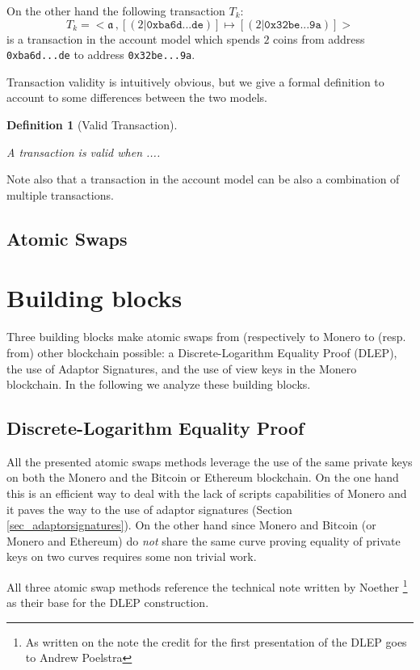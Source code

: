 \documentclass[runningheads]{llncs}
\newcommand{\tx}[3]{<\mathfrak{#1}\,, [#2]\mapsto[#3]>}
\newtheorem{deff}{Definition}
\begin{document}
On the other hand the following transaction $T_k$:
$$
T_k = \tx a {(2|\texttt{0xba6d...de})}{(2|\texttt{0x32be...9a})}
$$
is a transaction in the account model which spends $2$ coins from address \texttt{0xba6d...de} to  address \texttt{0x32be...9a}.

Transaction validity is intuitively obvious, but we give a formal definition to account to some differences between the two models.
\begin{deff}[Valid Transaction]\label{def_transaction_validity}
    
    A transaction is valid when ....
\end{deff}
Note also that a transaction in the account model can be also a combination of multiple transactions. 


\subsection{Atomic Swaps}
\label{sec_atomic_swaps}


\section{Building blocks}
Three building blocks make atomic swaps from (respectively to Monero to (resp. from) other blockchain possible: a Discrete-Logarithm Equality Proof (DLEP), the use of Adaptor Signatures, and the use of view keys in the Monero blockchain.
In the following we analyze these building blocks.

\subsection{Discrete-Logarithm Equality Proof} \label{sec_dlep}

All the presented atomic swaps methods leverage the use of the same private keys on both the Monero and the Bitcoin or Ethereum blockchain. On the one hand this is an efficient way to deal with the lack of scripts capabilities of Monero and it paves the way to the use of adaptor signatures (Section \ref{sec_adaptorsignatures}). On the other hand since Monero and Bitcoin (or Monero and Ethereum) do \emph{not} share the same curve proving equality of private keys on two curves requires some non trivial work.

All three atomic swap methods reference the technical note written by Noether \footnote{As written on the note the credit for the first presentation of the DLEP goes to Andrew Poelstra} \cite{dlep} as their base for the DLEP construction.
\end{document}
